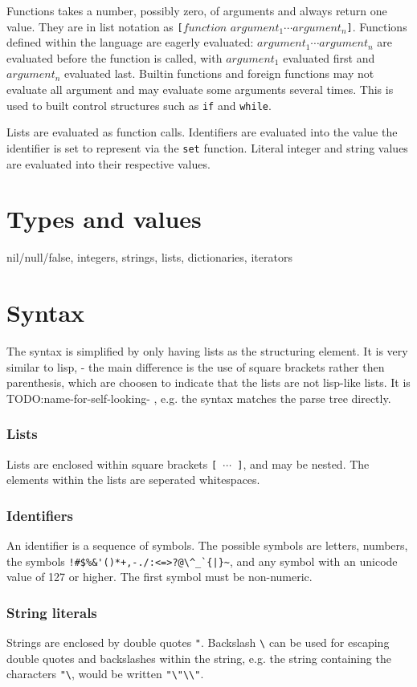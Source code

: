 Functions takes a number, possibly zero, of arguments and always return one value.
They are in list notation as \verb|[|$function$ $argument_1 \cdots argument_n$\verb|]|.
Functions defined within the language are eagerly evaluated: $argument_1\cdots argument_n$ are evaluated before the function is called, with $argument_1$ evaluated first and $argument_n$ evaluated last.
Builtin functions and foreign functions may not evaluate all argument and may evaluate some arguments several times. This is used to built control structures such as \verb|if| and \verb|while|.

Lists are evaluated as function calls.
Identifiers are evaluated into the value the identifier is set to represent via the \verb|set| function.
Literal integer and string values are evaluated into their respective values.

\section{Types and values}
nil/null/false, integers, strings, lists, dictionaries, iterators 

\section{Syntax}
The syntax is simplified by only having lists as the structuring element.
It is very similar to lisp, - the main difference is the use of square brackets rather then parenthesis, which are choosen to indicate that the lists are not lisp-like lists.
It is TODO:name-for-self-looking- , e.g. the syntax matches the parse tree directly.

\subsubsection{Lists}
Lists are enclosed within square brackets \verb|[ |$\cdots$\verb| ]|, and may be nested. The elements within the lists are seperated whitespaces.

\subsubsection{Identifiers}
An identifier is a sequence of symbols. The possible symbols are letters, numbers, the symbols \verb]!#$%&'()*+,-./:<=>?@\^_`{|}~], and any symbol with an unicode value of 127 or higher. The first symbol must be non-numeric.

\subsubsection{String literals}
Strings are enclosed by double quotes \verb|"|. Backslash \verb|\| can be used for escaping double quotes and backslashes within the string, e.g. the string containing the characters \verb|"\|, would be written \verb|"\"\\"|.

